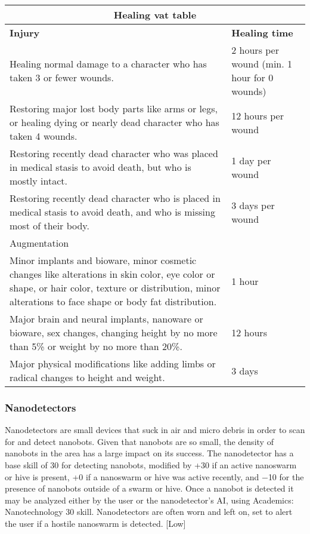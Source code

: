 \begin{table}
\begin{tabularx}{\textwidth}{|X|X|}
\hline
\multicolumn{2}{|c|}{Healing vat table} \\
\hline
\textbf{Injury}	& \textbf{Healing time} \\
\hline
Healing normal damage to a character who has taken 3 or fewer wounds.	& 2 hours per wound (min. 1 hour for 0 wounds) \\
\hline
Restoring major lost body parts like arms or legs, or healing dying or nearly dead character who has taken 4 wounds.		& 12 hours per wound \\
\hline
Restoring recently dead character who was placed in medical stasis to avoid death, but who is mostly intact.				& 1 day per wound \\
\hline
Restoring recently dead character who is placed in medical stasis to avoid death, and who is missing most of their body.	& 3 days per wound \\
\hline
\multicolumn{2}{|l|}{Augmentation} \\
\hline
Minor implants and bioware, minor cosmetic changes like alterations in skin color, eye color or shape, or hair color, texture or distribution, minor alterations to face shape or body fat distribution.	& 1 hour \\
\hline
Major brain and neural implants, nanoware or bioware, sex changes, changing height by no more than 5\% or weight by no more than 20\%.	& 12 hours \\
\hline
Major physical modifications like adding limbs or radical changes to height and weight.								& 3 days \\
\hline
\end{tabularx}
\label{tab:healing-vat}
\end{table}

\subsubsection{Nanodetectors}

Nanodetectors are small devices that suck in air and micro debris in order to scan for and detect nanobots. Given that nanobots are so small, the density of nanobots in the area has a large impact on its success. The nanodetector has a base skill of 30 for detecting nanobots, modified by +30 if an active nanoswarm or hive is present, +0 if a nanoswarm or hive was active recently, and $-$10 for the presence of nanobots outside of a swarm or hive. Once a nanobot is detected it may be analyzed either by the user or the nanodetector’s AI, using Academics: Nanotechnology 30 skill. Nanodetectors are often worn and left on, set to alert the user if a hostile nanoswarm is detected. [Low]

